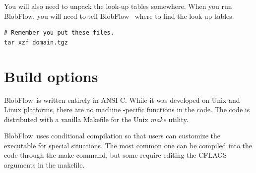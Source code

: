 \documentclass[12pt]{report}
\newcommand{\BF}{BlobFlow}
\begin{document}
You will also need to unpack the look-up tables somewhere.  When you run \BF,
you will need to tell \BF~ where to find the look-up tables.
\begin{verbatim}
# Remember you put these files.
tar xzf domain.tgz
\end{verbatim}


\section{Build options}

\BF~is written entirely in ANSI C.  While it was developed on Unix and Linux
platforms, there are no machine -pecific functions in the code.  The code is
distributed with a vanilla Makefile for the Unix {\em make} utility.

\BF~uses conditional compilation so that users can customize the
executable for special situations.  The most common one can be compiled into the
code through the make command, but some require editing the CFLAGS arguments in
the makefile.
\end{document}
